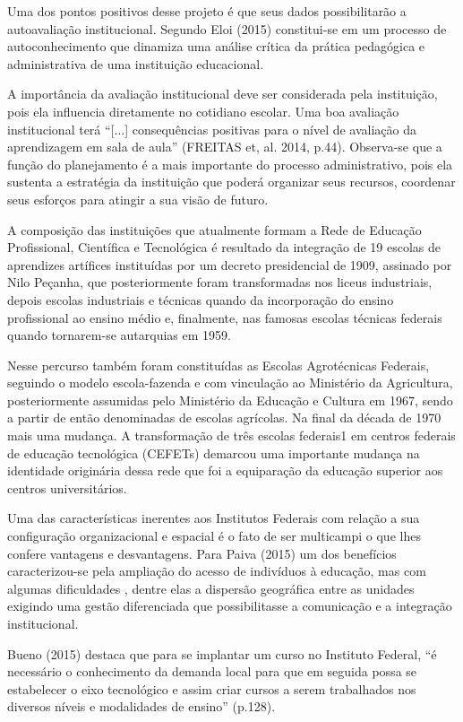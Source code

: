 \documentclass[article,12pt,onesidea,4paper,english,brazil]{abntex2}
\begin{document}
	Uma dos pontos positivos desse projeto é que seus dados possibilitarão a autoavaliação institucional. Segundo Eloi (2015) constitui-se em um processo de autoconhecimento que
	dinamiza uma análise crítica da prática pedagógica e administrativa de uma instituição
	educacional.
	
	A importância da avaliação institucional deve ser considerada pela instituição, pois ela
	influencia diretamente no cotidiano escolar. Uma boa avaliação institucional terá “[...]
	consequências positivas para o nível de avaliação da aprendizagem em sala de aula” (FREITAS
	et, al. 2014, p.44). Observa-se que a função do planejamento é a mais importante do processo
	administrativo, pois ela sustenta a estratégia da instituição que poderá organizar seus recursos,
	coordenar seus esforços para atingir a sua visão de futuro.
	
	A composição das instituições que atualmente formam a Rede de Educação Profissional,
	Científica e Tecnológica é resultado da integração de 19 escolas de aprendizes artífices instituídas
	por um decreto presidencial de 1909, assinado por Nilo Peçanha, que posteriormente foram
	transformadas nos liceus industriais, depois escolas industriais e técnicas quando da incorporação
	do ensino profissional ao ensino médio e, finalmente, nas famosas escolas técnicas federais
	quando tornarem-se autarquias em 1959.
	
	Nesse percurso também foram constituídas as Escolas Agrotécnicas Federais, seguindo o
	modelo escola-fazenda e com vinculação ao Ministério da Agricultura, posteriormente assumidas
	pelo Ministério da Educação e Cultura em 1967, sendo a partir de então denominadas de escolas
	agrícolas. Na final da década de 1970 mais uma mudança. A transformação de três escolas
	federais1
	em centros federais de educação tecnológica (CEFETs) demarcou uma importante
	mudança na identidade originária dessa rede que foi a equiparação da educação superior aos
	centros universitários.
	
	Uma das características inerentes aos Institutos Federais com relação a sua configuração
	organizacional e espacial é o fato de ser multicampi o que lhes confere vantagens e desvantagens.
	Para Paiva (2015) um dos benefícios caracterizou-se pela ampliação do acesso de indivíduos à
	educação, mas com algumas dificuldades , dentre elas a dispersão geográfica entre as unidades
	exigindo uma gestão diferenciada que possibilitasse a comunicação e a integração institucional. 
	
	Bueno (2015) destaca que para se implantar um curso no Instituto Federal, “é necessário o
	conhecimento da demanda local para que em seguida possa se estabelecer o eixo tecnológico e
	assim criar cursos a serem trabalhados nos diversos níveis e modalidades de ensino” (p.128).
	
\end{document}
